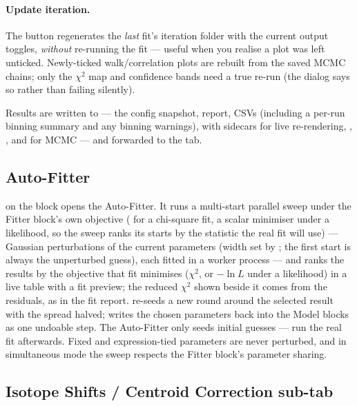 \paragraph{Update iteration.}
The  button regenerates the \emph{last} fit's
iteration folder with the current output toggles, \emph{without}
re-running the fit --- useful when you realise a plot was left
unticked. Newly-ticked walk/correlation plots are rebuilt from the
saved MCMC chains; only the $\chi^2$ map and confidence bands need a
true re-run (the dialog says so rather than failing silently).

Results are written to
 --- the config
snapshot, report, CSVs (including a per-run binning summary and any
binning warnings),  with  sidecars for live
re-rendering, , , and
 for MCMC --- and forwarded to the  tab.

\subsection{Auto-Fitter}
\label{sec:autofitter}

 on the  block opens the
Auto-Fitter. It runs a multi-start parallel sweep under the
Fitter block's own objective ( for a chi-square fit,
a scalar minimiser under a likelihood, so the sweep ranks its
starts by the statistic the real fit will use) ---
 Gaussian perturbations of the current parameters (width
set by ; the first start is always the unperturbed
guess), each fitted in a worker process --- and ranks the results by
the objective that fit minimises ($\chi^2$, or $-\ln L$ under a
likelihood) in a live table with a fit preview; the reduced $\chi^2$
shown beside it comes from the residuals, as in the fit report.  re-seeds a
new round around the selected result with the spread halved;
 writes the chosen parameters back into the
Model blocks as one undoable step. The Auto-Fitter only seeds
initial guesses --- run the real fit afterwards. Fixed and
expression-tied parameters are never perturbed, and in simultaneous
mode the sweep respects the Fitter block's parameter sharing.

\subsection{Isotope Shifts / Centroid Correction sub-tab}

